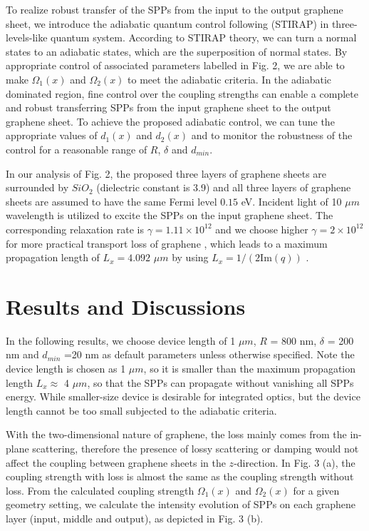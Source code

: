\documentclass[preprint,12pt,numbers,sort&compress]{elsarticle}
\begin{document}
To realize robust transfer of the SPPs from the input to the output graphene sheet, we introduce the adiabatic quantum control following (STIRAP) in three-levels-like quantum system.
According to STIRAP theory, we can turn a normal states to an adiabatic states, which are the superposition of normal states.
By appropriate control of associated parameters labelled in Fig. 2, we are able to make $\Omega_1(x)$ and $\Omega_2(x)$ to meet the adiabatic criteria.
In the adiabatic dominated region, fine control over the coupling strengths can enable a complete and robust transferring SPPs from the input graphene sheet to the output graphene sheet.
To achieve the proposed adiabatic control, we can tune the appropriate values of $d_1(x)$ and $d_2(x)$ and to monitor the robustness of the control for a reasonable range of $R$, $\delta$ and $d_{min}$.

In our analysis of Fig. 2, the proposed three layers of graphene sheets are surrounded by $SiO_2$ (dielectric constant is 3.9) and all three layers of graphene sheets are assumed to have the same Fermi level $0.15$ eV.
Incident light of 10 $\mu m$ wavelength is utilized to excite the SPPs on the input graphene sheet.
The corresponding relaxation rate is $\gamma=1.11 \times 10^{12}$ and we choose higher $\gamma=2 \times 10^{12}$ for more practical transport loss of graphene \cite{Wang12,Wang122}, which leads to a maximum propagation length of $L_{x}=4.092$ $\mu m$ by using $L_{x}= 1/ (2\text{Im}(q))$ \cite{Jackson98}.


\section{Results and Discussions}
In the following results, we choose device length of 1 $\mu m$, $R$ = 800 nm, $\delta$ = 200 nm and $d_{min}$ =20 nm as default parameters unless otherwise specified.
Note the device length is chosen as 1 $\mu m$, so it is smaller than the maximum propagation length $L_{x} \approx$ 4 $\mu m$, so that the SPPs can propagate without vanishing all SPPs energy.
While smaller-size device is desirable for integrated optics, but the device length cannot be too small subjected to the adiabatic criteria.

With the two-dimensional nature of graphene, the loss mainly comes from the in-plane scattering, therefore the presence of lossy scattering or damping would not affect the coupling between graphene sheets in the $z$-direction.
In Fig. 3 (a), the coupling strength with loss is almost the same as the coupling strength without loss.
From the calculated coupling strength $\Omega_1(x)$ and $\Omega_2(x)$ for a given geometry setting, we calculate the intensity evolution of SPPs on each graphene layer (input, middle and output), as depicted in Fig. 3 (b).
\end{document}
